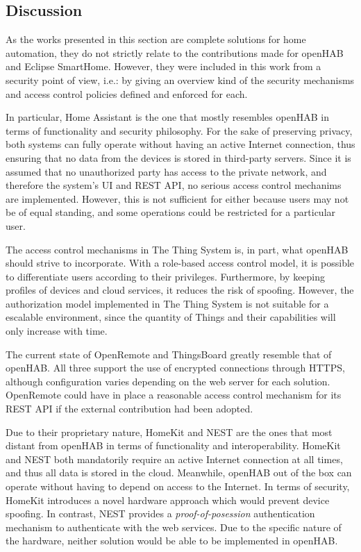 \documentclass[12pt]{article}
\begin{document}
\subsection{Discussion}

As the works presented in this section are complete solutions for home automation, they do not strictly relate to the contributions made for openHAB and Eclipse SmartHome. However, they were included in this work from a security point of view, i.e.: by giving an overview kind of the security mechanisms and access control policies defined and enforced for each.

In particular, Home Assistant is the one that mostly resembles openHAB in terms of functionality and security philosophy. For the sake of preserving privacy, both systems can fully operate without having an active Internet connection, thus ensuring that no data from the devices is stored in third-party servers. Since it is assumed that no unauthorized party has access to the private network, and therefore the system's UI and REST API, no serious access control mechanims are implemented. However, this is not sufficient for either because users may not be of equal standing, and some operations could be restricted for a particular user.

The access control mechanisms in The Thing System is, in part, what openHAB should strive to incorporate. With a role-based access control model, it is possible to differentiate users according to their privileges. Furthermore, by keeping profiles of devices and cloud services, it reduces the risk of spoofing. However, the authorization model implemented in The Thing System is not suitable for a escalable environment, since the quantity of Things and their capabilities will only increase with time.

The current state of OpenRemote and ThingsBoard greatly resemble that of openHAB. All three support the use of encrypted connections through HTTPS, although configuration varies depending on the web server for each solution. OpenRemote could have in place a reasonable access control mechanism for its REST API if the external contribution had been adopted.

Due to their proprietary nature, HomeKit and NEST are the ones that most distant from openHAB in terms of functionality and interoperability. HomeKit and NEST both mandatorily require an active Internet connection at all times, and thus all data is stored in the cloud. Meanwhile, openHAB out of the box can operate without having to depend on access to the Internet. In terms of security, HomeKit introduces a novel hardware approach which would prevent device spoofing. In contrast, NEST provides a \emph{proof-of-posession} authentication mechanism to authenticate with the web services. Due to the specific nature of the hardware, neither solution would be able to be implemented in openHAB. 
\end{document}
